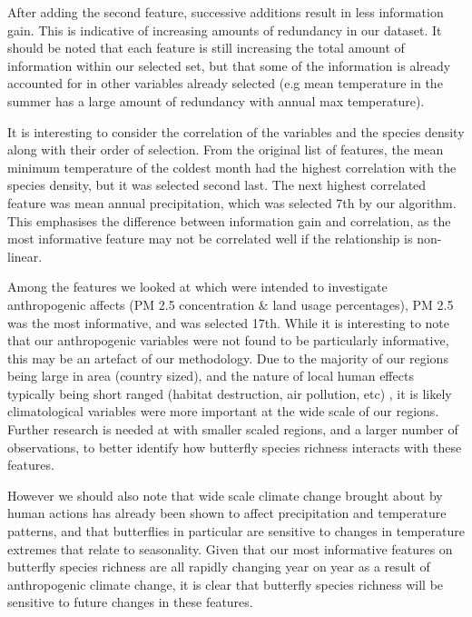 \documentclass[prl,showpacs,superscriptaddress,twocolumn,longbibliography]{revtex4-1}
\begin{document}
After adding the second feature, successive additions result in less information gain. This is indicative of increasing amounts of redundancy in our dataset. It should be noted that each feature is still increasing the total amount of information within our selected set, but that some of the information is already accounted for in other variables already selected (e.g mean temperature in the summer has a large amount of redundancy with annual max temperature).

It is interesting to consider the correlation of the variables and the species density along with their order of selection. From the original list of features, the mean minimum temperature of the coldest month had the highest correlation with the species density, but it was selected second last. The next highest correlated feature was mean annual precipitation, which was selected 7th by our algorithm. This emphasises the difference between information gain and correlation, as the most informative feature may not be correlated well if the relationship is non-linear.

Among the features we looked at which were intended to investigate anthropogenic affects (PM 2.5 concentration \& land usage percentages), PM 2.5 was the most informative, and was selected 17th. While it is interesting to note that our anthropogenic variables were not found to be particularly informative, this may be an artefact of our methodology. Due to the majority of our regions being large in area (country sized), and the nature of local human effects typically being short ranged (habitat destruction, air pollution, etc) \cite{he_urban_2014}, it is likely climatological variables were more important at the wide scale of our regions. Further research is needed at with smaller scaled regions, and a larger number of observations, to better identify how butterfly species richness interacts with these features. 

However we should also note that wide scale climate change brought about by human actions has already been shown to affect precipitation and temperature patterns\cite{trenberth_changes_2011, ashton_effects_2009}, and that butterflies in particular are sensitive to changes in temperature extremes that relate to seasonality\cite{bauerfeind_simulating_2014}. Given that our most informative features on butterfly species richness are all rapidly changing year on year as a result of anthropogenic climate change\cite{loarie_velocity_2009}, it is clear that butterfly species richness will be sensitive to future changes in these features. 
\end{document}
